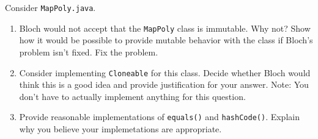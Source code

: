 Consider {\tt MapPoly.java}.

\begin{enumerate}
\item Bloch would not accept that the {\tt MapPoly} class 
is immutable.
Why not?  
Show how it would be possible to provide mutable behavior
with the class if Bloch's problem isn't fixed.
Fix the problem.
\item
Consider implementing  {\tt Cloneable} for this class.
Decide whether Bloch would think this is a good idea
and provide justification for your answer.
Note:  You don't have to actually implement anything for this question.
\item
Provide reasonable implementations of {\tt equals()} and {\tt hashCode()}.
Explain why you believe your implemetations are appropriate.
\end{enumerate}
